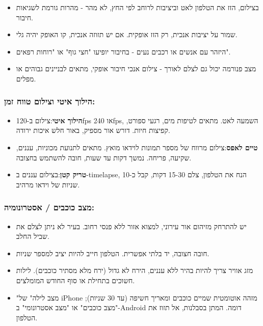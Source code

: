 \begin{itemize}
  \item בצילום, הזז את הטלפון לאט וביציבות לרוחב לפי החץ, לא מהר - מהרות גורמת לשגיאות חיבור.
  \item שמור על יציבות אנכית, רק הזז אופקית. אם יש תזוזה אנכית, קו האופק יהיה גלי.
  \item היזהר עם אנשים או רכבים נעים - בחיבור יופיעו "חצי גוף" או "רוחות רפאים".
  \item מצב פנורמה יכול גם לצלם לאורך - צילום אנכי חיבור אופקי, מתאים לבניינים גבוהים או מפלים.
\end{itemize}

\subsubsection*{הילוך איטי וצילום טווח זמן:}

\begin{itemize}
  \item \textbf{הילוך איטי}:צילום ב-120fps או 240fps, השמעה לאט. מתאים לטיפות מים, רגעי ספורט, קפיצות חיות. דורש אור מספיק, באור חלש איכות ירודה.
  \item \textbf{טיים לאפס}:צילום מרווח של מספר תמונות לוידאו מואץ. מתאים לתנועת מכוניות, עננים, שקיעה, פריחה. נמשך דקות עד שעות, חובה להשתמש בחצובה.
  \item \textbf{טריק קטן}:בצילום עננים ב-timelapse, הנח את הטלפון, צלם 15-30 דקות, קבל כ-10 שניות של וידאו מרהיב.
\end{itemize}

\subsubsection*{מצב כוכבים / אסטרונומיה:}

\begin{itemize}
  \item יש להתרחק מזיהום אור עירוני, למצוא אזור ללא פנסי רחוב. בעיר לא ניתן לצלם את שביל החלב.
  \item חובה חצובה, יד בלתי אפשרית. הטלפון חייב להיות יציב למספר שניות.
  \item מזג אוויר צריך להיות בהיר ללא עננים, הירח לא גדול (ירח מלא מסתיר כוכבים). לילות חשוכים בתחילת או סוף החודש המומלצים.
  \item "מצב לילה" של iPhone מזהה אוטומטית שמיים כוכבים ומאריך חשיפה (עד 30 שניות); "מצב כוכבים" או "מצב אסטרונומי" ב-Android דומה. המתן בסבלנות, אל תזוז את הטלפון.
\end{itemize}

